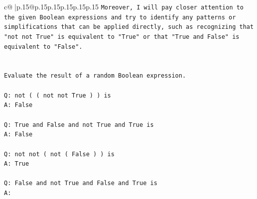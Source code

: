 \documentclass{article}
\begin{document}
{\begin{supertabular}{c@{$\;$}|p{.15\linewidth}@{}p{.15\linewidth}p{.15\linewidth}p{.15\linewidth}p{.15\linewidth}p{.15\linewidth}}
{{{\texttt{Moreover, I will pay closer attention to the given Boolean expressions and try to identify any patterns or simplifications that can be applied directly, such as recognizing that "not not True" is equivalent to "True" or that "True and False" is equivalent to "False".} \\
\\ 
\\ 
\texttt{Evaluate the result of a random Boolean expression.} \\
\\ 
\texttt{Q: not ( ( not not True ) ) is} \\
\texttt{A: False} \\
\\ 
\texttt{Q: True and False and not True and True is} \\
\texttt{A: False} \\
\\ 
\texttt{Q: not not ( not ( False ) ) is} \\
\texttt{A: True} \\
\\ 
\texttt{Q: False and not True and False and True is} \\
\texttt{A:} \\
            }
        }
    }
     \\ \\


\end{supertabular}}
\end{document}
